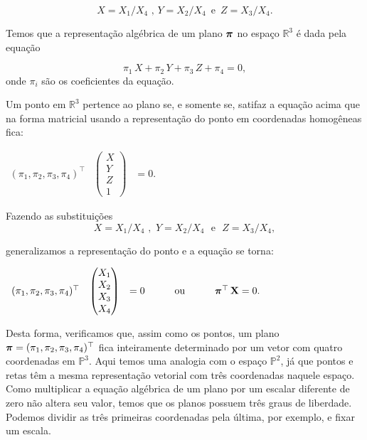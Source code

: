 \begin{equation*}
X=X_1/X_4 \,\, ,\, Y=X_2/X_4 \,\,\, \text{e} \,\,\, Z=X_3/X_4.
\end{equation*}

 


Temos que a representação algébrica de um plano $\boldsymbol{\pi}$ no espaço $\mathbb{R}^3$ é dada pela equação

\begin{equation*}
\pi_1\,X+\pi_2\,Y+\pi_3\,Z+\pi_4=0,
\end{equation*}
onde $\pi_i$ são os coeficientes da equação.

Um ponto em $\mathbb{R}^3$ pertence ao plano se, e somente se, satifaz a equação acima que na forma matricial usando a representação do ponto em coordenadas homogêneas fica:

\begin{center}
$
\begin{array}{ccc}
  (\pi_1,\pi_2,\pi_3,\pi_4)^\top
& \begin{pmatrix}
  X\\
  Y\\
  Z\\
  1
  \end{pmatrix}
& = 0.
\end{array}
$
\end{center}

Fazendo as substituições 
\begin{equation*}
X=X_1/X_4 \,\, , \,\, Y=X_2/X_4 \,\,\,\, \text{e} \,\,\,\, Z=X_3/X_4 ,
\end{equation*}

generalizamos a representação do ponto e a equação se torna:

\begin{center}
$
\begin{array}{ccccc}
(\pi_1,\pi_2,\pi_3,\pi_4)^\top
& \begin{pmatrix}
  X_1\\
  X_2\\
  X_3\\
  X_4
  \end{pmatrix}
& = 0
& \qquad \text{ou} \qquad
& \boldsymbol{\pi}^\top \, \mathbf{X} = 0.
\end{array}
$
\end{center}


Desta forma, verificamos que, assim como os pontos, um plano $\boldsymbol{\pi} = (\pi_1,\pi_2,\pi_3,\pi_4)^\top$ fica inteiramente determinado por um vetor com quatro coordenadas em $\mathbb{P}^3$. Aqui temos uma analogia com o espaço $\mathbb{P}^2$, já que pontos e retas têm a mesma representação vetorial com três coordenadas naquele espaço. Como multiplicar a equação algébrica de um plano por um escalar diferente de zero não altera seu valor, temos que os planos possuem três graus de liberdade. Podemos dividir as três primeiras coordenadas pela última, por exemplo, e fixar um escala.

